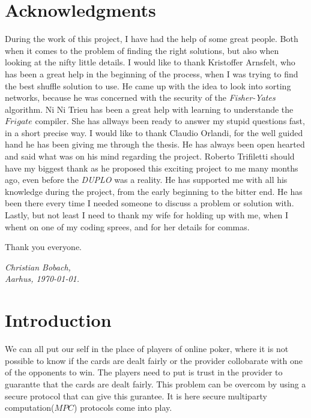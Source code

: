 \documentclass[twoside,11pt,openright]{report}
\newcommand{\FY}{\textit{Fisher-Yates} }
\newcommand{\DUPLO}{\textit{DUPLO} }
\begin{document}
\chapter*{Acknowledgments}
During the work of this project, I have had the help of some great people. Both when it comes to the problem of finding the right solutions, but also when looking at the nifty little details. I would like to thank Kristoffer Arnsfelt, who has been a great help in the beginning of the process, when I was trying to find the best shuffle solution to use. He came up with the idea to look into sorting networks, because he was concerned with the security of the \FY algorithm. Ni Ni Trieu has been a great help with learning to understande the $Frigate$ compiler. She has allways been ready to answer my stupid questions fast, in a short precise way. I would like to thank Claudio Orlandi, for the well guided hand he has been giving me through the thesis. He has always been open hearted and said what was on his mind regarding the project. Roberto Trifiletti should have my biggest thank as he proposed this exciting project to me many months ago, even before the \DUPLO was a reality. He has supported me with all his knowledge during the project, from the early beginning to the bitter end. He has been there every time I needed someone to discuss a problem or solution with. Lastly, but not least I need to thank my wife for holding up with me, when I whent on one of my coding sprees, and for her details for commas.

Thank you everyone.

\vspace{2ex}
\begin{flushright}
  \emph{Christian Bobach,}\\
  \emph{Aarhus, \today.}
\end{flushright}

\tableofcontents
{}
\setcounter{secnumdepth}{2}

\chapter{Introduction}
\label{ch:intro}

We can all put our self in the place of players of online poker, where it is not possible to know if the cards are dealt fairly or the provider collobarate with one of the opponents to win. The players need to put is trust in the provider to guarantte that the cards are dealt fairly. This problem can be overcom by using a secure protocol that can give this gurantee. It is here secure multiparty computation($MPC$) protocols come into play.
\end{document}
